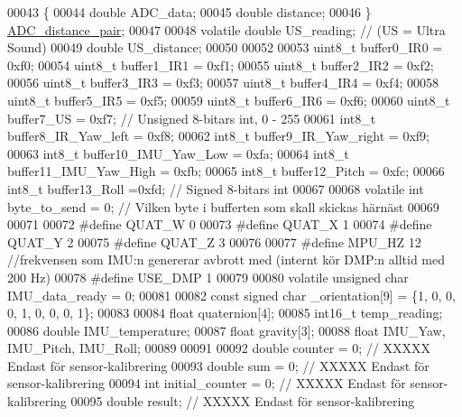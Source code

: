 \begin{DoxyCode}
00043 \{
00044     \textcolor{keywordtype}{double} ADC\_data;
00045     \textcolor{keywordtype}{double} distance;
00046 \} \hyperlink{struct_a_d_c__distance__pair}{ADC\_distance\_pair};
00047 
00048 \textcolor{keyword}{volatile} \textcolor{keywordtype}{double} US\_reading;                                 \textcolor{comment}{// (US = Ultra Sound)}
00049 \textcolor{keywordtype}{double} US\_distance;
00050 
00052 
00053 uint8\_t buffer0\_IR0 = 0xf0;
00054 uint8\_t buffer1\_IR1 = 0xf1;
00055 uint8\_t buffer2\_IR2 = 0xf2;
00056 uint8\_t buffer3\_IR3 = 0xf3;
00057 uint8\_t buffer4\_IR4 = 0xf4;
00058 uint8\_t buffer5\_IR5 = 0xf5;
00059 uint8\_t buffer6\_IR6 = 0xf6;
00060 uint8\_t buffer7\_US = 0xf7;      \textcolor{comment}{// Unsigned 8-bitars int, 0 - 255}
00061 int8\_t buffer8\_IR\_Yaw\_left = 0xf8;
00062 int8\_t buffer9\_IR\_Yaw\_right = 0xf9;
00063 int8\_t buffer10\_IMU\_Yaw\_Low = 0xfa;
00064 int8\_t buffer11\_IMU\_Yaw\_High = 0xfb;
00065 int8\_t buffer12\_Pitch = 0xfc;
00066 int8\_t buffer13\_Roll =0xfd;     \textcolor{comment}{// Signed 8-bitars int}
00067 
00068 \textcolor{keyword}{volatile} \textcolor{keywordtype}{int} byte\_to\_send = 0;          \textcolor{comment}{// Vilken byte i bufferten som skall skickas härnäst}
00069 
00071 
00072 \textcolor{preprocessor}{#define QUAT\_W 0}
00073 \textcolor{preprocessor}{#define QUAT\_X 1}
00074 \textcolor{preprocessor}{#define QUAT\_Y 2}
00075 \textcolor{preprocessor}{#define QUAT\_Z 3}
00076 
00077 \textcolor{preprocessor}{#define MPU\_HZ 12       //frekvensen som IMU:n genererar avbrott med (internt kör DMP:n alltid med 200 Hz)}
00078 \textcolor{preprocessor}{#define USE\_DMP 1}
00079 
00080 \textcolor{keyword}{volatile} \textcolor{keywordtype}{unsigned} \textcolor{keywordtype}{char} IMU\_data\_ready = 0;
00081 
00082 \textcolor{keyword}{const} \textcolor{keywordtype}{signed} \textcolor{keywordtype}{char} \_orientation[9] = \{1, 0, 0,  0, 1, 0,  0, 0, 1\};
00083 
00084 \textcolor{keywordtype}{float} quaternion[4];
00085 int16\_t temp\_reading;
00086 \textcolor{keywordtype}{double} IMU\_temperature;
00087 \textcolor{keywordtype}{float} gravity[3];
00088 \textcolor{keywordtype}{float} IMU\_Yaw, IMU\_Pitch, IMU\_Roll;
00089 
00091 
00092 \textcolor{keywordtype}{double} counter = 0;             \textcolor{comment}{// XXXXX Endast för sensor-kalibrering}
00093 \textcolor{keywordtype}{double} sum = 0;                 \textcolor{comment}{// XXXXX Endast för sensor-kalibrering}
00094 \textcolor{keywordtype}{int} initial\_counter = 0;        \textcolor{comment}{// XXXXX Endast för sensor-kalibrering}
00095 \textcolor{keywordtype}{double} result;                  \textcolor{comment}{// XXXXX Endast för sensor-kalibrering}

\end{DoxyCode}
